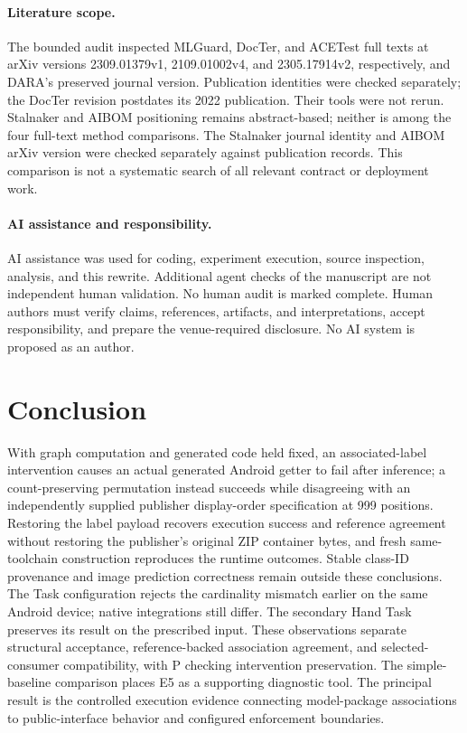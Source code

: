 \documentclass[10pt,twocolumn,letterpaper]{article}
\begin{document}
\paragraph{Literature scope.}
The bounded audit inspected MLGuard, DocTer, and ACETest full texts at arXiv versions 2309.01379v1, 2109.01002v4, and 2305.17914v2, respectively, and DARA's preserved journal version. Publication identities were checked separately; the DocTer revision postdates its 2022 publication. Their tools were not rerun. Stalnaker and AIBOM positioning remains abstract-based; neither is among the four full-text method comparisons. The Stalnaker journal identity and AIBOM arXiv version were checked separately against publication records. This comparison is not a systematic search of all relevant contract or deployment work.

\paragraph{AI assistance and responsibility.}
AI assistance was used for coding, experiment execution, source inspection, analysis, and this rewrite. Additional agent checks of the manuscript are not independent human validation. No human audit is marked complete. Human authors must verify claims, references, artifacts, and interpretations, accept responsibility, and prepare the venue-required disclosure. No AI system is proposed as an author.

\section{Conclusion}
With graph computation and generated code held fixed, an associated-label intervention causes an actual generated Android getter to fail after inference; a count-preserving permutation instead succeeds while disagreeing with an independently supplied publisher display-order specification at 999 positions. Restoring the label payload recovers execution success and reference agreement without restoring the publisher's original ZIP container bytes, and fresh same-toolchain construction reproduces the runtime outcomes. Stable class-ID provenance and image prediction correctness remain outside these conclusions. The Task configuration rejects the cardinality mismatch earlier on the same Android device; native integrations still differ. The secondary Hand Task preserves its result on the prescribed input. These observations separate structural acceptance, reference-backed association agreement, and selected-consumer compatibility, with P checking intervention preservation. The simple-baseline comparison places E5 as a supporting diagnostic tool. The principal result is the controlled execution evidence connecting model-package associations to public-interface behavior and configured enforcement boundaries.
\end{document}
